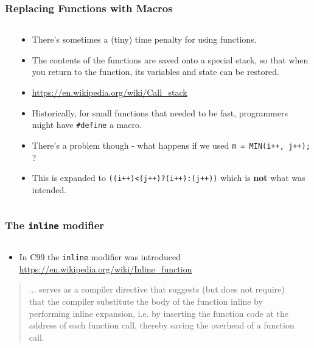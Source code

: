 \begin{frame}[fragile]
\frametitle{Replacing Functions with Macros}
\begin{columns}

\begin{column}{0.40\textwidth}

\end{column}

\pause
\begin{column}{0.50\textwidth}
\begin{itemize}[<+->]
\item There's sometimes a (tiny) time penalty for using functions.
\item The contents of the functions are saved onto a special stack, so that when you return to the function, its variables and state can be restored.
\item \url{https://en.wikipedia.org/wiki/Call_stack}
\item Historically, for small functions that needed to be fast, programmers might have \verb^#define^ a macro.
\item There's a problem though - what happens if we used {\tt m = MIN(i++, j++);} ?
\item This is expanded to {\tt ((i++)<(j++)?(i++):(j++))} which is {\bf not} what was intended.
\end{itemize}
\end{column}

\end{columns}
\end{frame}


\begin{frame}[fragile]
\frametitle{The {\tt inline} modifier}
\begin{columns}

\begin{column}{0.50\textwidth}
\begin{itemize}[<+->]
\item In C99 the {\tt inline} modifier was introduced
\url{https://en.wikipedia.org/wiki/Inline_function}
\end{itemize}
\begin{quote}
... serves as a compiler directive that suggests (but does not
require) that the compiler substitute the body of the function inline by
performing inline expansion, i.e. by inserting the function code at the
address of each function call, thereby saving the overhead of a function
call.
\end{quote}
\end{column}

\begin{column}{0.40\textwidth}

\end{column}

\end{columns}
\end{frame}

